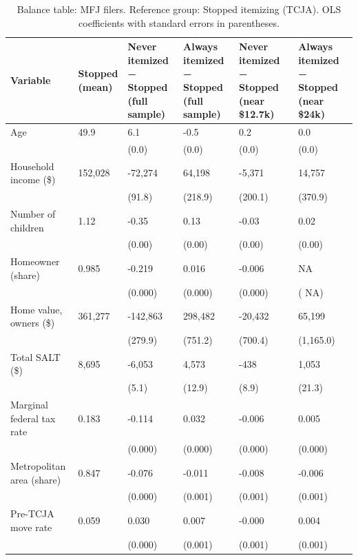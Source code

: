 \begin{table}

\caption{\label{tab:tab:balance}Balance table: MFJ filers. Reference group: Stopped itemizing (TCJA). OLS coefficients with standard errors in parentheses.}
\centering
\small
\setlength{\tabcolsep}{4pt}
\begin{tabular}[t]{llllll}
\toprule
Variable & \shortstack{Stopped\\(mean)} & \shortstack{Never itemized − Stopped\\(full sample)} & \shortstack{Always itemized − Stopped\\(full sample)} & \shortstack{Never itemized − Stopped\\(near \$12.7k)} & \shortstack{Always itemized − Stopped\\(near \$24k)}\\
\midrule
Age & 49.9 & 6.1 & -0.5 & 0.2 & 0.0\\
 &  & (0.0) & (0.0) & (0.0) & (0.0)\\
Household income (\$) & 152,028 & -72,274 & 64,198 & -5,371 & 14,757\\
 &  & (91.8) & (218.9) & (200.1) & (370.9)\\
Number of children & 1.12 & -0.35 & 0.13 & -0.03 & 0.02\\
\addlinespace
 &  & (0.00) & (0.00) & (0.00) & (0.00)\\
Homeowner (share) & 0.985 & -0.219 & 0.016 & -0.006 & NA\\
 &  & (0.000) & (0.000) & (0.000) & (  NA)\\
Home value, owners (\$) & 361,277 & -142,863 & 298,482 & -20,432 & 65,199\\
 &  & (279.9) & (751.2) & (700.4) & (1,165.0)\\
\addlinespace
Total SALT (\$) & 8,695 & -6,053 & 4,573 & -438 & 1,053\\
 &  & (5.1) & (12.9) & (8.9) & (21.3)\\
Marginal federal tax rate & 0.183 & -0.114 & 0.032 & -0.006 & 0.005\\
 &  & (0.000) & (0.000) & (0.000) & (0.000)\\
Metropolitan area (share) & 0.847 & -0.076 & -0.011 & -0.008 & -0.006\\
\addlinespace
 &  & (0.000) & (0.001) & (0.001) & (0.001)\\
Pre-TCJA move rate & 0.059 & 0.030 & 0.007 & -0.000 & 0.004\\
 &  & (0.000) & (0.001) & (0.001) & (0.001)\\
\bottomrule
\end{tabular}
\end{table}
